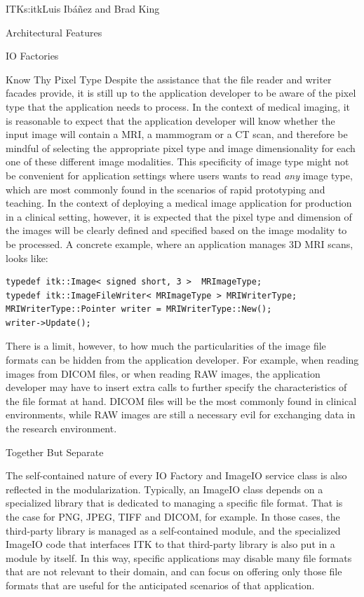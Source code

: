 \begin{aosachapter}{ITK}{s:itk}{Luis Ib\'{a}\~{n}ez and Brad King}
\begin{aosasect1}{Architectural Features}
\begin{aosasect2}{IO Factories}
\begin{aosasect3}{Know Thy Pixel Type}
Despite the assistance that the file reader and writer facades provide, it is
still up to the application developer to be aware of the pixel type that the
application needs to process. In the context of medical imaging, it is
reasonable to expect that the application developer will know whether the input
image will contain a MRI, a mammogram or a CT scan, and therefore be mindful of
selecting the appropriate pixel type and image dimensionality for each one of
these different image modalities. This specificity of image type might not be
convenient for application settings where users wants to read \emph{any}
image type, which are most commonly found in the scenarios of rapid prototyping
and teaching.  In the context of deploying a medical image application for
production in a clinical setting, however, it is expected that the pixel type
and dimension of the images will be clearly defined and specified based on the
image modality to be processed. A concrete example, where an application manages 3D MRI scans, looks like:

\begin{verbatim}
typedef itk::Image< signed short, 3 >  MRImageType;
typedef itk::ImageFileWriter< MRImageType > MRIWriterType;
MRIWriterType::Pointer writer = MRIWriterType::New();
writer->Update();
\end{verbatim}

There is a limit, however, to how much the particularities of the image file
formats can be hidden from the application developer.  For example, when
reading images from DICOM files, or when reading RAW images, the application
developer may have to insert extra calls to further specify the characteristics
of the file format at hand. DICOM files will be the most commonly found in
clinical environments, while RAW images are still a necessary evil for
exchanging data in the research environment.

\end{aosasect3}

\begin{aosasect3}{Together But Separate}

The self-contained nature of every IO Factory and ImageIO service class is
also reflected in the modularization. Typically, an ImageIO class depends on a
specialized library that is dedicated to managing a specific file format. That
is the case for PNG, JPEG, TIFF and DICOM, for example. In those cases, the
third-party library is managed as a self-contained module, and the specialized
ImageIO code that interfaces ITK to that third-party library is also put in a
module by itself. In this way, specific applications may disable many
file formats that are not relevant to their domain, and can focus on offering
only those file formats that are useful for the anticipated scenarios of that
application.


\end{aosasect3}
\end{aosasect2}
\end{aosasect1}
\end{aosachapter}
